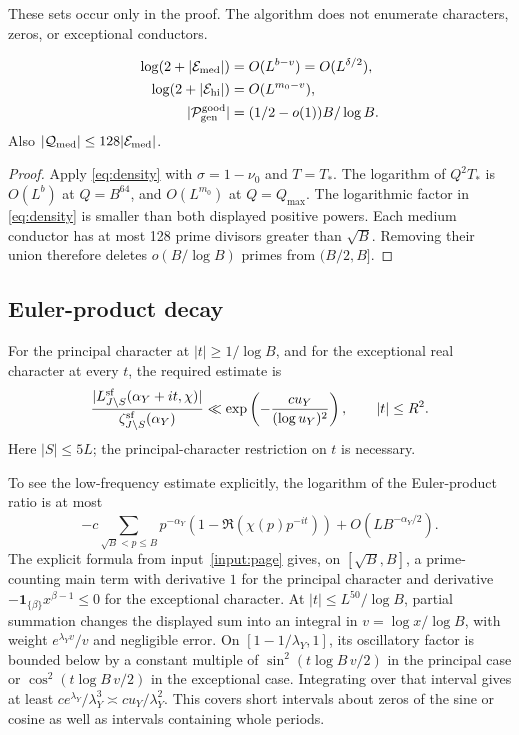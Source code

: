 These sets occur only in the proof.  The algorithm does not enumerate
characters, zeros, or exceptional conductors.

\begin{lemma}\label{lem:exception-count}
\begin{align*}
 \log(2+|\mathcal E_{\rm med}|)&=O(L^{b-v})=O(L^{\delta/2}),\\
 \log(2+|\mathcal E_{\rm hi}|)&=O(L^{m_0-v}),\\
 |\mathcal P_{\rm gen}^{\rm good}|
       &=(1/2-o(1))B/\log B.
\end{align*}
Also \(|\mathcal Q_{\rm med}|\le128|\mathcal E_{\rm med}|\).
\end{lemma}

\begin{proof}
Apply \eqref{eq:density} with \(\sigma=1-\nu_0\) and
\(T=T_*\).  The logarithm of \(Q^2T_*\) is \(O(L^b)\) at
\(Q=B^{64}\), and \(O(L^{m_0})\) at \(Q=Q_{\max}\).
The logarithmic factor in \eqref{eq:density} is smaller than both
displayed positive powers.  Each medium conductor has at most
128 prime divisors greater than \(\sqrt B\).  Removing their union
therefore deletes \(o(B/\log B)\) primes from \((B/2,B]\).
\end{proof}

\subsection{Euler-product decay}

For the principal character at \(|t|\ge1/\log B\), and for the
exceptional real character at every \(t\), the required estimate is
\begin{equation}\label{eq:repulsion}
 \frac{|L_{J\setminus S}^{\rm sf}(\alpha_Y+it,\chi)|}
      {\zeta_{J\setminus S}^{\rm sf}(\alpha_Y)}
 \ll\exp\left(-\frac{cu_Y}{(\log u_Y)^2}\right),
 \qquad |t|\le R^2.
\end{equation}
Here \(|S|\le5L\); the principal-character restriction on \(t\)
is necessary.

To see the low-frequency estimate explicitly, the logarithm of the
Euler-product ratio is at most
\[
 -c\sum_{\sqrt B<p\le B}p^{-\alpha_Y}
       (1-\Re(\chi(p)p^{-it}))+O(LB^{-\alpha_Y/2}).
\]
The explicit formula from input~\ref{input:page} gives, on
\([\sqrt B,B]\), a prime-counting main term with derivative \(1\)
for the principal character and derivative
\(-\mathbf1_{\{\beta\}}x^{\beta-1}\le0\) for the exceptional
character.  At \(|t|\le L^{50}/\log B\), partial summation changes
the displayed sum into an integral in \(v=\log x/\log B\), with
weight \(e^{\lambda_Yv}/v\) and negligible error.
On \([1-1/\lambda_Y,1]\), its oscillatory factor is bounded below
by a constant multiple of \(\sin^2(t\log B\,v/2)\) in the principal
case or \(\cos^2(t\log B\,v/2)\) in the exceptional case.
Integrating over that interval gives at least
\(c e^{\lambda_Y}/\lambda_Y^3\asymp cu_Y/\lambda_Y^2\).
This covers short intervals about zeros of the sine or cosine as well
as intervals containing whole periods.

